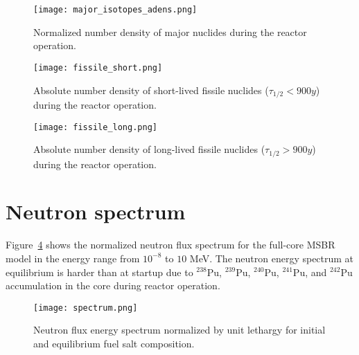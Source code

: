 \begin{figure}[htp!] %
  \centering
  \vspace{-0.3em}
  \texttt{[image: major\_isotopes\_adens.png]}
  \caption{Normalized number density of major nuclides during the reactor operation.}
  \vspace{-0.6em}
  \label{fig:adens_eq}
\end{figure}
\FloatBarrier

\begin{figure}[htp!] %
  \centering
  \vspace{-1.3em}
  \texttt{[image: fissile\_short.png]}
   \vspace{-1.5em}
  \caption{Absolute number density of short-lived fissile nuclides ($\tau_{1/2}<900y$) during the reactor operation.}
  \vspace{-1.6em}
  \label{fig:fissile_short}
\end{figure}
\begin{figure}[hbp!] %
  \centering
  \vspace{-0.3em}
  \texttt{[image: fissile\_long.png]}
   \vspace{-1.5em}
  \caption{Absolute number density of long-lived fissile nuclides ($\tau_{1/2}>900y$) during the reactor operation.}
  \vspace{-2.6em}
  \label{fig:fissile_long}
\end{figure}
\FloatBarrier

\section{Neutron spectrum}
Figure~\ref{fig:spectrum} shows the normalized neutron flux spectrum for the full-core \gls{MSBR} model in the energy range from $10^{-8}$ to $10$ MeV. The neutron energy spectrum at equilibrium is harder than at startup due to $^{238}$Pu, $^{239}$Pu, $^{240}$Pu, $^{241}$Pu, and $^{242}$Pu accumulation in the core during reactor operation. 

\begin{figure}[htp!] %
  \centering
    \vspace{-0.3em}
  \texttt{[image: spectrum.png]} 
  \caption{Neutron flux energy spectrum normalized by unit lethargy for initial and equilibrium fuel salt composition.}
    \vspace{-0.6em}
  \label{fig:spectrum}
\end{figure}
\FloatBarrier

